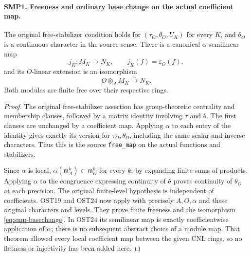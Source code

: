 \paragraph{SMP1. Freeness and ordinary base change on the actual coefficient map.}
\label{claim:SMP1}
The original free-stabilizer condition holds for
$(\tau_O,\theta_O,U_K)$ for every $K$, and
$\theta_O$ is a continuous character in the source sense.
There is a canonical $\alpha$-semilinear map
\[
               j_K:M_K\longrightarrow N_K,
                        \qquad j_K(f)=\varepsilon_O(f),
\]
and its $O$-linear extension is an isomorphism
\begin{equation}\label{eq:smp-basechange}
                  O\otimes_A M_K\xrightarrow{\sim}N_K.
\end{equation}
Both modules are finite free over their respective rings.
\begin{proof}
The original free-stabilizer assertion has group-theoretic
centrality and membership clauses, followed by a matrix
identity involving $\tau$ and $\theta$.  The first clauses
are unchanged by a coefficient map.  Applying $\alpha$
to each entry of the identity gives exactly its version
for $\tau_O,\theta_O$, including the same scalar and
inverse characters.  Thus this is the source
\texttt{free\_map} on the actual functions and stabilizers.

Since $\alpha$ is local,
$\alpha(\mathfrak m_A^k)\subset\mathfrak m_O^k$ for
every $k$, by expanding finite sums of products.  Applying
$\alpha$ to the congruence expressing continuity of
$\theta$ proves continuity of $\theta_O$ at each precision.
The original finite-level hypothesis is independent of
coefficients.  OST19 and OST24 now apply with precisely
$A,O,\alpha$ and these original characters and levels.
They prove finite freeness and the isomorphism
\eqref{eq:smp-basechange}.  In OST24 its semilinear map
is exactly coefficientwise application of $\alpha$;
there is no subsequent abstract choice of a module map.
That theorem allowed every local coefficient map between
the given CNL rings, so no flatness or injectivity has
been added here.
\end{proof}

